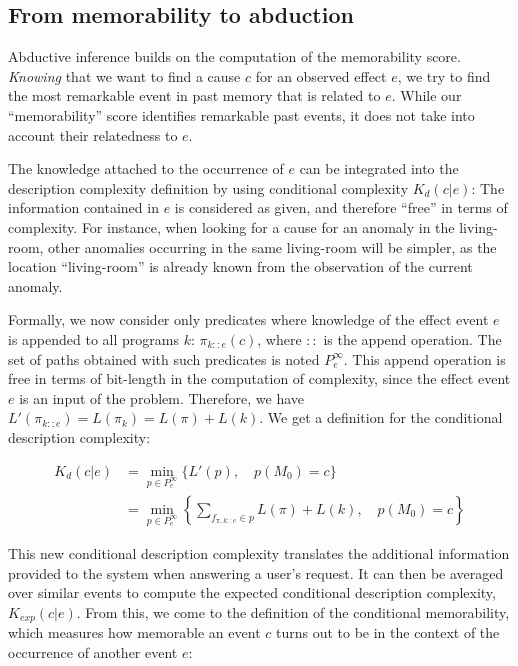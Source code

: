 \documentclass[conference]{IEEEtran}
\begin{document}
\subsection{From memorability to abduction}
Abductive inference builds on the computation
of the memorability score. \emph{Knowing} that we want to find a cause $c$
for an observed effect $e$, we try to find the most remarkable event in past
memory that is related to $e$. While our ``memorability'' score identifies remarkable past events, it does not take into account their relatedness to $e$.

The knowledge attached to the occurrence of $e$ can be integrated into the description complexity definition by using conditional complexity $K_d(c | e)$: The information contained in $e$ is considered as given, and therefore ``free'' in terms of complexity. For instance, when looking for a cause for
an anomaly in the living-room, other anomalies occurring in the same
living-room will be simpler, as the location ``living-room'' is already known
from the observation of the current anomaly.

Formally, we now consider only predicates where knowledge of the effect event $e$  is appended to all programs $k$:
$\pi_{k::e}(c)$, where $::$ is the append operation. The set of paths obtained with such predicates is noted $P^\infty_e$. This append operation is free in terms of bit-length in the computation of complexity, since the effect event $e$ is an input of the problem. Therefore, we have $L'(\pi_{k::e}) = L(\pi_k) = L(\pi) + L(k)$. We get a definition for the conditional description complexity:

\begin{align}
  \label{eq:abd_k}
  K_d(c | e) & = \min_{p \in P^\infty_e} \{L'(p), \quad p(M_0)=c \}                                                \\
             & = \min_{p \in P^\infty_e} \left\{\sum_{f_{\pi, k::e} \in p} L(\pi) + L(k), \quad p(M_0) = c\right\}
\end{align}

This new conditional description complexity translates the additional information provided to the
system when answering a user's request. It can then be averaged over similar events to compute the expected conditional description complexity, $K_{exp}(c|e)$. From this, we come to the definition of the conditional memorability, which measures how memorable an event $c$ turns out to be in the context of the occurrence of another event $e$:
\end{document}
